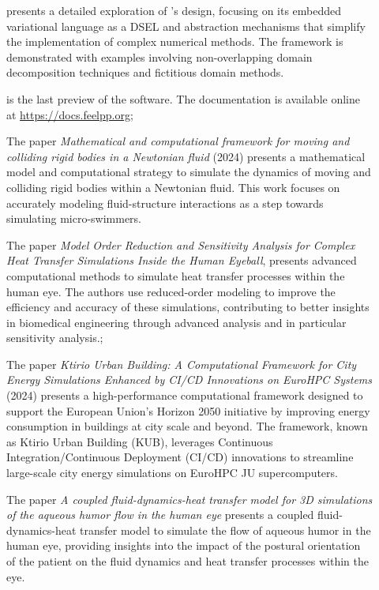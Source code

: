 \begin{description}
        \item[] presents a detailed exploration of \Feelpp's design, focusing on its embedded variational language as a \ac{DSEL} and abstraction mechanisms that simplify the implementation of complex numerical methods. The framework is demonstrated with examples involving non-overlapping domain decomposition techniques and fictitious domain methods.
        \item[] is the last preview of the \Feelpp software. The documentation is available online at \url{https://docs.feelpp.org};
        \item[] The paper \emph{Mathematical and computational framework for moving and colliding rigid bodies in a Newtonian fluid} (2024) presents a mathematical model and computational strategy to simulate the dynamics of moving and colliding rigid bodies within a Newtonian fluid. This work focuses on accurately modeling fluid-structure interactions as a step towards simulating micro-swimmers.
        \item[] The paper \emph{Model Order Reduction and Sensitivity Analysis for Complex Heat Transfer Simulations Inside the Human Eyeball}, presents advanced computational methods to simulate heat transfer processes within the human eye. The authors use reduced-order modeling to improve the efficiency and accuracy of these simulations, contributing to better insights in biomedical engineering through advanced analysis and in particular sensitivity analysis.;
        \item[] The paper \emph{Ktirio Urban Building: A Computational Framework for City Energy Simulations Enhanced by CI/CD Innovations on EuroHPC Systems} (2024) presents a high-performance computational framework designed to support the European Union's Horizon 2050 initiative by improving energy consumption in buildings at city scale and beyond. The framework, known as Ktirio Urban Building (KUB), leverages Continuous Integration/Continuous Deployment (CI/CD) innovations to streamline large-scale city energy simulations on EuroHPC JU supercomputers.
        \item[] The paper \emph{A coupled fluid-dynamics-heat transfer model for 3D simulations of the aqueous humor flow in the human eye} presents a coupled fluid-dynamics-heat transfer model to simulate the flow of aqueous humor in the human eye, providing insights into the impact of the postural orientation of the patient on the fluid dynamics and heat transfer processes within the eye.

\end{description}
